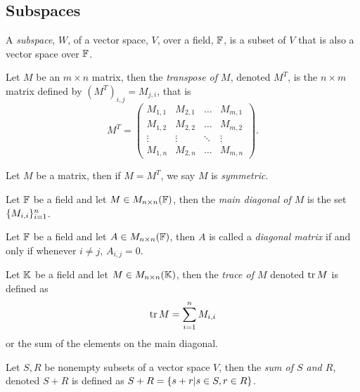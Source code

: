 \pagebreak

\subsection{Subspaces}

\begin{definition}[Subspace]
	A \textit{subspace}, $W$, of a vector space, $V$, over a field, $\mathbb{F}$, is a subset of $V$ that is also a vector space over $\mathbb{F}$.
\end{definition}

\begin{definition}
	Let $M$ be an $m\times n$ matrix, then the \textit{transpose of $M$}, denoted $M^T$, is the $n\times m$ matrix defined by $(M^T)_{i,j}=M_{j,i}$, that is
	\[
		M^T=
		\begin{pmatrix}
			M_{1,1} & M_{2,1} & \ldots & M_{m,1}\\
			M_{1,2} & M_{2,2} & \ldots & M_{m,2}\\
			\vdots & \vdots & \ddots & \vdots\\
			M_{1,n} & M_{2,n} & \ldots & M_{m,n}
		\end{pmatrix}.
	\]
\end{definition}

\begin{definition}
	Let $M$ be a matrix, then if $M=M^T$, we say $M$ is \textit{symmetric}.
\end{definition}

\begin{definition}
	Let $\mathbb{F}$ be a field and let $M\in M_{n\times n}(\mathbb{F})$, then the \textit{main diagonal of $M$} is the set $\lbrace M_{i,i} \rbrace_{i=1}^n$.
\end{definition}

\begin{definition}
	Let $\mathbb{F}$ be a field and let $A\in M_{n\times n}(\mathbb{F})$, then $A$ is called a \textit{diagonal matrix} if and only if whenever $i\neq j$, $A_{i,j}=0$.
\end{definition}

\begin{definition}
	Let $\mathbb{K}$ be a field and let $M\in M_{n\times n}(\mathbb{K})$, then the \textit{trace of $M$} denoted $\operatorname{tr} M$ is defined as
	\[
		\operatorname{tr} M = \sum_{i=1}^n M_{i,i}
	\]
	or the sum of the elements on the main diagonal.
\end{definition}

\begin{definition}
	Let $S,R$ be nonempty subsets of a vector space $V$, then the \textit{sum of $S$ and $R$}, denoted $S+R$ is defined as $S+R=\lbrace s+r|s\in S, r\in R \rbrace$.
\end{definition}


